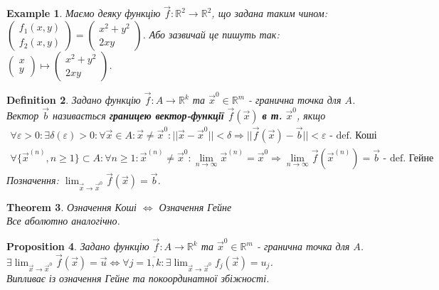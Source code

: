 \documentclass[a4paper, 10pt]{article}
\def\huge{\displaystyle}
\theoremstyle{theoremdd}
\newtheorem{theorem}{Theorem}[subsection]
\theoremstyle{theoremdd}
\theoremstyle{theoremdd}
\newtheorem{definition}[theorem]{Definition}
\theoremstyle{theoremdd}
\theoremstyle{theoremdd}
\newtheorem{example}[theorem]{Example}
\theoremstyle{theoremdd}
\newtheorem{proposition}[theorem]{Proposition}
\theoremstyle{theoremdd}
\theoremstyle{theoremdd}
\theoremstyle{theoremdd}
\begin{document}
\begin{example}
Маємо деяку функцію $\vec{f}: \mathbb{R}^2 \to \mathbb{R}^2$, що задана таким чином:\\
$\begin{pmatrix}
f_1(x,y) \\
f_2(x,y)
\end{pmatrix} = \begin{pmatrix}
x^2 + y^2 \\ 2xy
\end{pmatrix}$. Або зазвичай це пишуть так: $\begin{pmatrix}
x \\ y
\end{pmatrix} \mapsto \begin{pmatrix}
x^2+y^2 \\ 2xy
\end{pmatrix}$.
\end{example}

\begin{definition}
Задано функцію $\vec{f}: A \to \mathbb{R}^k$ та $\vec{x}^0 \in \mathbb{R}^m$ - гранична точка для $A$.\\
Вектор $\vec{b}$ називається \textbf{границею вектор-функції} $\vec{f}(\vec{x})$ \textbf{в т.} $\vec{x}^0$, якщо
\begin{align*}
\forall \varepsilon > 0: \exists \delta(\varepsilon) > 0: \forall \vec{x} \in A: \vec{x} \neq \vec{x}^0: ||\vec{x} - \vec{x}^0 || < \delta \Rightarrow ||\vec{f}(\vec{x}) - \vec{b}|| < \varepsilon \textrm{ - def. Коші}\\
\forall \{\vec{x}^{(n)}, n \geq 1\} \subset A: \forall n \geq 1: \vec{x}^{(n)} \neq \vec{x}^0: \huge \lim_{n \to \infty} \vec{x}^{(n)} = \vec{x}^0 \Rightarrow \lim_{n \to \infty} \vec{f}(\vec{x}^{(n)}) = \vec{b} \textrm{ - def. Гейне}
\end{align*}
Позначення: $\huge \lim_{\vec{x} \to \vec{x}^0} \vec{f}(\vec{x}) = \vec{b}$.
\end{definition}

\begin{theorem}
Означення Коші $\iff$ Означення Гейне\\
\textit{Все аболютно аналогічно.}
\end{theorem}

\begin{proposition}
Задано функцію $\vec{f}: A \to \mathbb{R}^k$ та $\vec{x}^0 \in \mathbb{R}^m$ - гранична точка для $A$.\\
$\exists \huge\lim_{\vec{x} \to \vec{x}^0} \vec{f}(\vec{x}) = \vec{u} \iff \forall j = \overline{1,k}: \exists \lim_{\vec{x} \to \vec{x}^0} f_j(\vec{x}) = u_j$.\\
\textit{Випливає із означення Гейне та покоординатної збіжності.}
\end{proposition}
\end{document}
